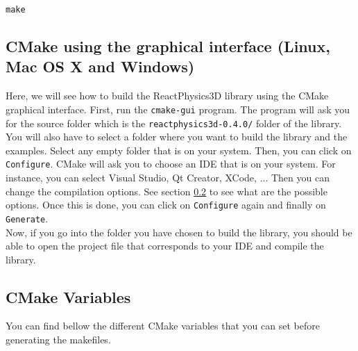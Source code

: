 \documentclass[a4paper,12pt]{article}
\begin{document}
    \texttt{make}

    \subsection{CMake using the graphical interface (Linux, Mac OS X and Windows)}

     Here, we will see how to build the ReactPhysics3D library using the CMake graphical interface. 
     First, run the \texttt{cmake-gui} program. The program will ask you for the
     source folder which is the \texttt{reactphysics3d-0.4.0/} folder of
     the library. You will also have to select a folder where you want to
     build the library and the examples. Select any empty folder that
     is on your system. Then, you can click on \texttt{Configure}. CMake will ask you to choose an IDE that is on
     your system. For instance, you can select Visual Studio, Qt Creator, XCode, ... Then you
     can change the compilation options. See section \ref{sec:cmakevariables} to see what are the possible options.
     Once this is done, you can click on \texttt{Configure} again and finally on \texttt{Generate}. \\ 
    
     Now, if you go into the folder you have chosen to build the
     library, you should be able to open the project file that corresponds to your IDE and compile
     the library.

     \subsection{CMake Variables}
     \label{sec:cmakevariables}

     You can find bellow the different CMake variables that you can set before generating the makefiles.
\end{document}

